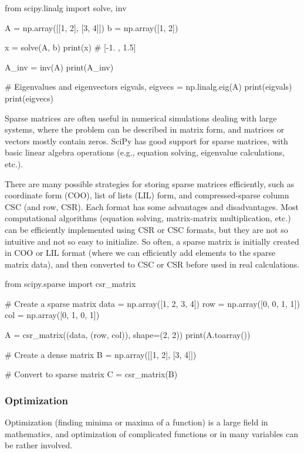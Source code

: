 \begin{codeblock}[language=python]
from scipy.linalg import solve, inv

A = np.array([[1, 2], [3, 4]])
b = np.array([1, 2])

x = solve(A, b)
print(x)  # [-1. ,  1.5]

A_inv = inv(A)
print(A_inv)

# Eigenvalues and eigenvectors
eigvals, eigvecs = np.linalg.eig(A)
print(eigvals)
print(eigvecs)
\end{codeblock}

Sparse matrices are often useful in numerical simulations dealing with large systems, where the
problem can be described in matrix form, and matrices or vectors mostly contain zeros. SciPy has
good support for sparse matrices, with basic linear algebra operations (e.g., equation solving,
eigenvalue calculations, etc.).

There are many possible strategies for storing sparse matrices efficiently, such as coordinate form
(COO), list of lists (LIL) form, and compressed-sparse column CSC (and row, CSR). Each format
has some advantages and disadvantages. Most computational algorithms (equation solving,
matrix-matrix multiplication, etc.) can be efficiently implemented using CSR or CSC formats, but
they are not so intuitive and not so easy to initialize. So often, a sparse matrix is initially created in
COO or LIL format (where we can efficiently add elements to the sparse matrix data), and then
converted to CSC or CSR before used in real calculations.

\begin{codeblock}[language=python]
from scipy.sparse import csr_matrix

# Create a sparse matrix
data = np.array([1, 2, 3, 4])
row = np.array([0, 0, 1, 1])
col = np.array([0, 1, 0, 1])

A = csr_matrix((data, (row, col)), shape=(2, 2))
print(A.toarray())

# Create a dense matrix
B = np.array([[1, 2], [3, 4]])

# Convert to sparse matrix
C = csr_matrix(B)
\end{codeblock}

\subsubsection*{Optimization}

Optimization (finding minima or maxima of a function) is a large field in mathematics, and
optimization of complicated functions or in many variables can be rather involved.

